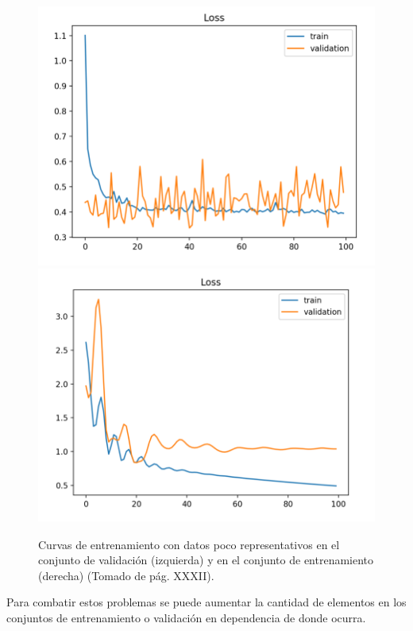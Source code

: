 \begin{figure}[h!]
	\begin{center}
		\includegraphics[scale=.2]{Graphics/unrepresentative_dev_set.png}
		\includegraphics[scale=.2]{Graphics/unrepresentative_train_set.png}
	    \caption{Curvas de entrenamiento con datos poco representativos en el conjunto de validación (izquierda) 
		y en el conjunto de entrenamiento (derecha) (Tomado de \cite{brownlee2018better} pág. XXXII).}\label{fig:unrepresentative_data}
	\end{center}
\end{figure}

Para combatir estos problemas se puede aumentar la cantidad de elementos en los conjuntos de entrenamiento o 
validación en dependencia de donde ocurra.


